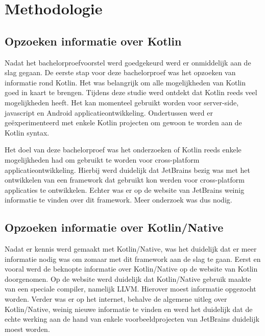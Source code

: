 
\chapter{Methodologie}
\label{ch:methodologie}


\section{Opzoeken informatie over Kotlin}
Nadat het bachelorproefvoorstel werd goedgekeurd werd er onmiddelijk aan de slag gegaan. De eerste stap voor deze bachelorproef was het opzoeken van informatie rond Kotlin. Het was belangrijk om alle mogelijkheden van Kotlin goed in kaart te brengen. Tijdens deze studie werd ontdekt dat Kotlin reeds veel mogelijkheden heeft. Het kan momenteel gebruikt worden voor server-side, javascript en Android applicatieontwikkeling. Ondertussen werd er geëxperimenteerd met enkele Kotlin projecten om gewoon te worden aan de Kotlin syntax.

Het doel van deze bachelorproef was het onderzoeken of Kotlin reeds enkele mogelijkheden had om gebruikt te worden voor cross-platform applicatieontwikkeling. Hierbij werd duidelijk dat JetBrains bezig was met het ontwikkelen van een framework dat gebruikt kon werden voor cross-platform applicaties te ontwikkelen. Echter was er op de website van JetBrains weinig informatie te vinden over dit framework. Meer onderzoek was dus nodig.

\section{Opzoeken informatie over Kotlin/Native}
\label{sec:infokn}
Nadat er kennis werd gemaakt met Kotlin/Native, was het duidelijk dat er meer informatie nodig was om zomaar met dit framework aan de slag te gaan. Eerst en vooral werd de beknopte informatie over Kotlin/Native op de website van Kotlin doorgenomen. Op de website werd duidelijk dat Kotlin/Native gebruik maakte van een speciale compiler, namelijk LLVM. Hierover moest informatie opgezocht worden. Verder was er op het internet, behalve de algemene uitleg over Kotlin/Native, weinig nieuwe informatie te vinden en werd het duidelijk dat de echte werking aan de hand van enkele voorbeeldprojecten van JetBrains duidelijk moest worden.

